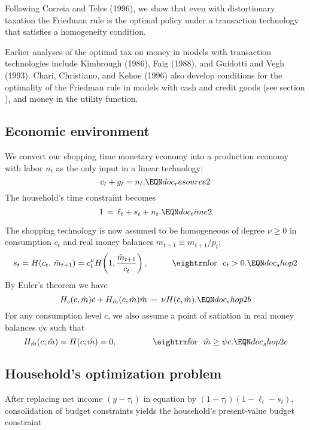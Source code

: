  
Following Correia and Teles (1996),
we show that even with distortionary
taxation the Friedman rule is the optimal policy under a transaction
technology  that satisfies a  homogeneity condition.


Earlier analyses of the optimal tax on money in models with
transaction technologies include Kimbrough (1986), Faig (1988),
and Guidotti and Vegh (1993).
Chari, Christiano, and Kehoe (1996) also develop conditions for the optimality
of the Friedman rule in models with cash and credit goods (see
section ), and money in the
utility function.
   
  


\subsection{Economic environment}
We convert our
shopping time monetary economy into a production economy
with labor $n_t$ as the only input in a linear technology:
$$ c_{t} + g_t = n_t.                   \EQN doc_resource2$$
The household's time constraint becomes
$$
1\,=\, \ell_t + s_t + n_t.      \EQN doc_time2
$$


The shopping technology
is now assumed to be homogeneous of degree $\nu\geq 0$
in consumption $c_t$ and real money balances $\hat m_{t+1}\equiv m_{t+1}/p_t$;
$$
s_t = H(c_t,\, \hat m_{t+1})
    = c_t^{\nu} H\!\left(1, {\hat m_{t+1} \over c_t}\right),
                                         \hskip1cm \hbox{\rm for\ \ }c_t>0.
                                                             \EQN doc_shop2
$$
By Euler's theorem we have
$$
H_c(c, \hat m) c + H_{\hat m}(c, \hat m) \hat m \,=\, \nu H(c, \hat m). \EQN doc_shop2b
$$
For any consumption level $c$, we also assume a point of satiation in real
money balances $\psi c$ such that
$$
H_{\hat m}(c, \hat m) = H(c, \hat m) =  0, \hskip1.5cm
                       \hbox{\rm for\ \ }\hat m \geq \psi c.     \EQN doc_shop2c
$$




\subsection{Household's optimization problem}
After replacing net income $(y-\tau_t)$ in equation 
by $(1-\tau_t) (1 - \ell_t -s_t)$, consolidation of budget
constraints yields the household's present-value budget constraint


